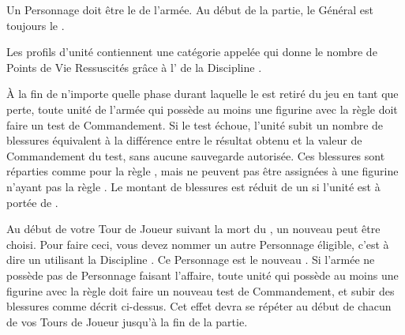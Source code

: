 \newcommand{\greatmonstrousrevenantrule}{%
Le \monstrousrevenant{} gagne \thunderouscharge{} et sa taille de socle change en \unit{60x100}{\milli\meter}.
}

\newcommand{\colossalzombiedragonrule}{%
La figurine gagne +1 en Capacité de Combat, la valeur de sa \innatedefence{} passe à ($ 3+ $), et sa taille de socle change en \unit{100x150}{\milli\meter}.
}







\startarmywiderules

\armywideruleentry{\masterofundeath}

Un Personnage doit être le \textbf{\master{}} de l'armée. Au début de la partie, le Général est toujours le \master{}.

\armywideruleentry{\invocation}

Les profils d'unité contiennent une catégorie appelée \invocation{} qui donne le nombre de Points de Vie Ressuscités grâce à l'\necromancysignaturespell{} de la Discipline \necromancy{}.

\closearmywiderules

\vspace*{1.5cm}
\startarmyspecialrules

\armyspecialruleentry{\ashestoashes}

À la fin de n'importe quelle phase durant laquelle le \master{} est retiré du jeu en tant que perte, toute unité de l'armée qui possède au moins une figurine avec la règle \ashestoashes{} doit faire un test de Commandement. Si le test échoue, l'unité subit un nombre de blessures équivalent à la différence entre le résultat obtenu et la valeur de Commandement du test, sans aucune sauvegarde autorisée. Ces blessures sont réparties comme pour la règle \unstable{}, mais ne peuvent pas être assignées à une figurine n'ayant pas la règle \ashestoashes{}. Le montant de blessures est réduit de un si l'unité est à portée de \holdyourground{}.

Au début de votre Tour de Joueur suivant la mort du \master{}, un nouveau \master{} peut être choisi. Pour faire ceci, vous devez nommer un autre Personnage éligible, c'est à dire un \wizard{} utilisant la Discipline \necromancy{}. Ce Personnage est le nouveau \master{}. Si l'armée ne possède pas de Personnage faisant l'affaire, toute unité qui possède au moins une figurine avec la règle \ashestoashes{} doit faire un nouveau test de Commandement, et subir des blessures comme décrit ci-dessus. Cet effet devra se répéter au début de chacun de vos Tours de Joueur jusqu'à la fin de la partie.

